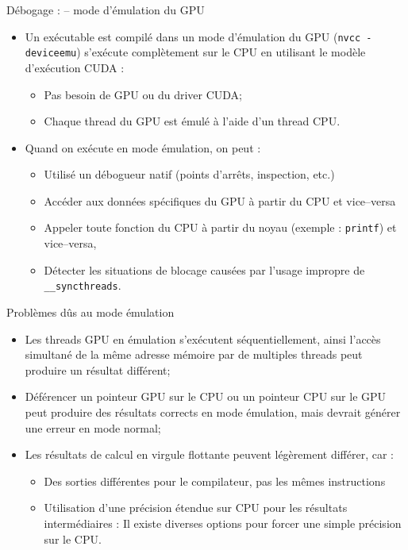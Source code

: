 \documentclass{beamer}
\begin{document}
\begin{frame}{Débogage : -- mode d'émulation du GPU}

  \begin{itemize}
  \item Un exécutable est compilé dans un mode d'émulation du GPU
    (\texttt{nvcc -deviceemu}) s'exécute complètement sur le CPU en utilisant le modèle
    d'exécution CUDA :
    \begin{itemize}
    \item Pas besoin de GPU ou du driver CUDA;
    \item Chaque thread du GPU est émulé à l'aide d'un thread CPU.
    \end{itemize}
  \item Quand on exécute en mode émulation, on peut :
    \begin{itemize}
    \item Utilisé un débogueur natif (points d'arrêts, inspection, etc.)
    \item Accéder aux données spécifiques du GPU à partir du CPU et vice--versa
    \item Appeler toute fonction du CPU à partir du noyau (exemple : \texttt{printf})
      et vice--versa,
    \item Détecter les situations de blocage causées par l'usage impropre de
      \texttt{\_\_syncthreads}.
    \end{itemize}
  \end{itemize}

\end{frame}

\begin{frame}{Problèmes dûs au mode émulation}

\begin{itemize}
\item Les threads GPU en émulation s'exécutent séquentiellement, ainsi l'accès simultané de la même adresse mémoire
  par de multiples threads peut produire un résultat différent;
\item Déférencer un pointeur GPU sur le CPU ou un pointeur CPU sur le GPU
  peut produire des résultats corrects en mode émulation, mais devrait
  générer une erreur en mode normal;
\item Les résultats de calcul en virgule flottante peuvent légèrement différer, car :
  \begin{itemize}
  \item Des sorties différentes pour le compilateur, pas les mêmes instructions
  \item Utilisation d'une précision étendue sur CPU pour les résultats intermédiaires :
    Il existe diverses options pour forcer une simple précision sur le CPU.
  \end{itemize}
\end{itemize}
\end{frame}
\end{document}
